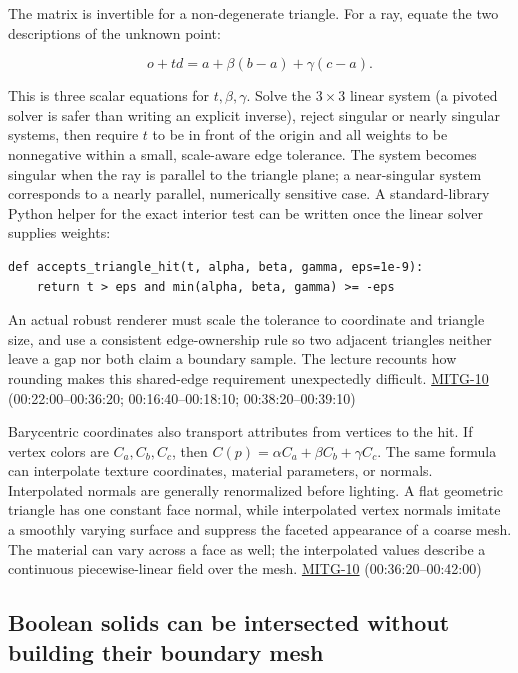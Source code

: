 The matrix is invertible for a non-degenerate triangle. For a ray, equate the two descriptions of the unknown point:

\[
o+td=a+\beta(b-a)+\gamma(c-a).
\]

This is three scalar equations for \(t,\beta,\gamma\). Solve the \(3\times3\) linear system (a pivoted solver is safer than writing an explicit inverse), reject singular or nearly singular systems, then require \(t\) to be in front of the origin and all weights to be nonnegative within a small, scale-aware edge tolerance. The system becomes singular when the ray is parallel to the triangle plane; a near-singular system corresponds to a nearly parallel, numerically sensitive case. A standard-library Python helper for the exact interior test can be written once the linear solver supplies weights:

\begin{verbatim}
def accepts_triangle_hit(t, alpha, beta, gamma, eps=1e-9):
    return t > eps and min(alpha, beta, gamma) >= -eps
\end{verbatim}

An actual robust renderer must scale the tolerance to coordinate and triangle size, and use a consistent edge-ownership rule so two adjacent triangles neither leave a gap nor both claim a boundary sample. The lecture recounts how rounding makes this shared-edge requirement unexpectedly difficult. \hyperref[04-visual-computing-ii-ch036-mitg-10---ray-casting-ii]{MITG-10} (00:22:00--00:36:20; 00:16:40--00:18:10; 00:38:20--00:39:10)

Barycentric coordinates also transport attributes from vertices to the hit. If vertex colors are \(C_a,C_b,C_c\), then \(C(p)=\alpha C_a+\beta C_b+\gamma C_c\). The same formula can interpolate texture coordinates, material parameters, or normals. Interpolated normals are generally renormalized before lighting. A flat geometric triangle has one constant face normal, while interpolated vertex normals imitate a smoothly varying surface and suppress the faceted appearance of a coarse mesh. The material can vary across a face as well; the interpolated values describe a continuous piecewise-linear field over the mesh. \hyperref[04-visual-computing-ii-ch036-mitg-10---ray-casting-ii]{MITG-10} (00:36:20--00:42:00)

\subsection{Boolean solids can be intersected without building their boundary mesh}\label{04-visual-computing-ii-ch028-boolean-solids-can-be-intersected-without-building-their-boundary-mesh}

